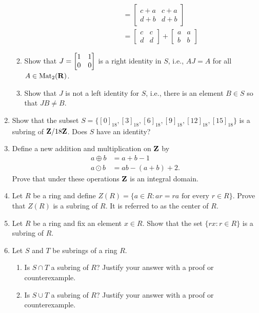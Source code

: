 \documentclass[11pt]{article}
\begin{document}
\begin{enumerate}
\begin{enumerate}
\begin{description}
\begin{itemize}
\begin{align*}
                            &= \begin{bmatrix}c+a&c+a\\d+b&d+b\end{bmatrix}\\
                            &= \begin{bmatrix}c&c\\d&d\end{bmatrix} + \begin{bmatrix}a&a\\b&b\end{bmatrix}
          \end{align*}
      \end{itemize}
  \end{description}
\item Show that $J = \left[ \begin{matrix} 1 & 1 \\ 0 & 0 \end{matrix} \right]$ is a right identity in $S$, i.e., $AJ = A$ for all $A \in \operatorname{Mat}_2(\mathbf{R})$. 
\item Show that $J$ is not a left identity for $S$, i.e., there is an element $B \in S$ so that $JB \neq B$. 
\end{enumerate}

\item Show that the subset $S = \{[0]_{18}, [3]_{18}, [6]_{18}, [9]_{18}, [12]_{18}, [15]_{18}\}$ is a subring of $\mathbf{Z}/18\mathbf{Z}$.  Does $S$ have an identity?

\item Define a new addition and multiplication on $\mathbf{Z}$ by 
\begin{align*}
a\oplus b&= a+b-1 \\
a\odot b&= ab - (a+b)+2.
\end{align*}
Prove that under these operations $\mathbf{Z}$ is an integral domain. 

\item Let $R$ be a ring and define $\textrm{$Z(R) = \{a \in R: ar = ra$ for every $r \in R$}\}$. Prove that $Z(R)$ is a subring of $R$. It is referred to as the center of $R$. 

\item Let $R$ be a ring and fix an element $x \in R$.  Show that the set $\{rx: r \in R\}$ is a subring of $R$. 

\item Let $S$ and $T$ be subrings of a ring $R$. 
\begin{enumerate}
\item Is $S\cap T$ a subring of $R$?  Justify your answer with a proof or counterexample.
\item Is $S\cup T$ a subring of $R$?  Justify your answer with a proof or counterexample.
\end{enumerate}


\end{enumerate}
\end{document}
